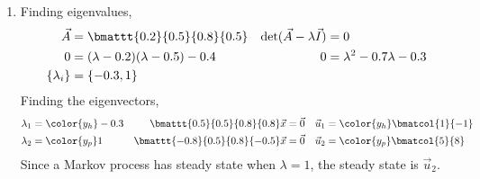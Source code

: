 \begin{enumerate}
    \item Finding eigenvalues,
          \begin{align}
              \vec{A}                        & = \bmattt{0.2}{0.5}{0.8}{0.5}          &
              \det(\vec{A} - \lambda\vec{I}) & = 0                                      \\
              0                              & = (\lambda - 0.2)(\lambda - 0.5) - 0.4 &
              0                              & = \lambda^2 - 0.7 \lambda - 0.3          \\
              \{\lambda_i\}                  & = \{ -0.3, 1 \}
          \end{align}
          Finding the eigenvectors,
          \begin{align}
              \lambda_1                             & = \color{y_h} -0.3 &
              \bmattt{0.5}{0.5}{0.8}{0.8} \vec{x}   & = \vec{0}          &
              \vec{u}_1                             & = \color{y_h}
              \bmatcol{1}{-1}                                              \\
              \lambda_2                             & = \color{y_p} 1    &
              \bmattt{-0.8}{0.5}{0.8}{-0.5} \vec{x} & = \vec{0}          &
              \vec{u}_2                             & = \color{y_p}
              \bmatcol{5}{8}
          \end{align}
          Since a Markov process has steady state when $ \lambda  = 1$, the steady state
          is $\vec{u}_2$.


\end{enumerate}
